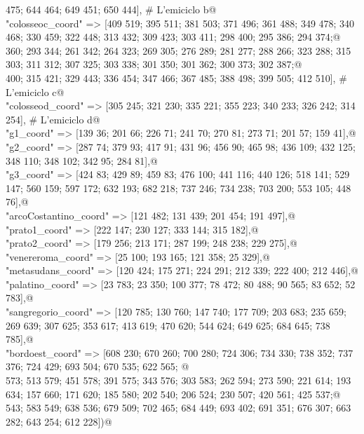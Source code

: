 \documentclass[]{article}
\begin{document}
\begin{flushleft}
\begin{minipage}{\linewidth}
\begin{list}{}{}
\mbox{} 475; 644 464; 649 451; 650 444], # L'emiciclo b@\\
\mbox{}\verb@"colosseoc_coord" => [409 519; 395 511; 381 503; 371 496; 361 488; 349 478; 340 468; 330 459; 322 448; 313 432; 309 423; 303 411; 298 400; 295 386; 294 374;@\\
\mbox{} 360; 293 344; 261 342; 264 323; 269 305; 276 289; 281 277; 288 266; 323 288; 315 303; 311 312; 307 325; 303 338; 301 350; 301 362; 300 373; 302 387;@\\
\mbox{} 400; 315 421; 329 443; 336 454; 347 466; 367 485; 388 498; 399 505; 412 510], # L'emiciclo c@\\
\mbox{}\verb@"colosseod_coord" => [305 245; 321 230; 335 221; 355 223; 340 233; 326 242; 314 254], # L'emiciclo d@\\
\mbox{}\verb@"g1_coord" => [139 36; 201 66; 226 71; 241 70; 270 81; 273 71; 201 57; 159 41],@\\
\mbox{}\verb@"g2_coord" => [287 74; 379 93; 417 91; 431 96; 456 90; 465 98; 436 109; 432 125; 348 110; 348 102; 342 95; 284 81],@\\
\mbox{}\verb@"g3_coord" => [424 83; 429 89; 459 83; 476 100; 441 116; 440 126; 518 141; 529 147; 560 159; 597 172; 632 193; 682 218; 737 246; 734 238; 703 200; 553 105; 448 76],@\\
\mbox{}\verb@"arcoCostantino_coord" => [121 482; 131 439; 201 454; 191 497],@\\
\mbox{}\verb@"prato1_coord" => [222 147; 230 127; 333 144; 315 182],@\\
\mbox{}\verb@"prato2_coord" => [179 256; 213 171; 287 199; 248 238; 229 275],@\\
\mbox{}\verb@"venereroma_coord" => [25 100; 193 165; 121 358; 25 329],@\\
\mbox{}\verb@"metasudans_coord" => [120 424; 175 271; 224 291; 212 339; 222 400; 212 446],@\\
\mbox{}\verb@"palatino_coord" => [23 783; 23 350; 100 377; 78 472; 80 488; 90 565; 83 652; 52 783],@\\
\mbox{}\verb@"sangregorio_coord" => [120 785; 130 760; 147 740; 177 709; 203 683; 235 659; 269 639; 307 625; 353 617; 413 619; 470 620; 544 624; 649 625; 684 645; 738 785],@\\
\mbox{}\verb@"bordoest_coord" => [608 230; 670 260; 700 280; 724 306; 734 330; 738 352; 737 376; 724 429; 693 504; 670 535; 622 565; @\\
\mbox{} 573; 513 579; 451 578; 391 575; 343 576; 303 583; 262 594; 273 590; 221 614; 193 634; 157 660; 171 620; 185 580; 202 540; 206 524; 230 507; 420 561; 425 537;@\\
\mbox{} 543; 583 549; 638 536; 679 509; 702 465; 684 449; 693 402; 691 351; 676 307; 663 282; 643 254; 612 228])@\\
\mbox{}\verb@@{\NWsep}
\end{list}
\vspace{-2ex}
\end{minipage}\\[4ex]
\end{flushleft}
\end{document}
